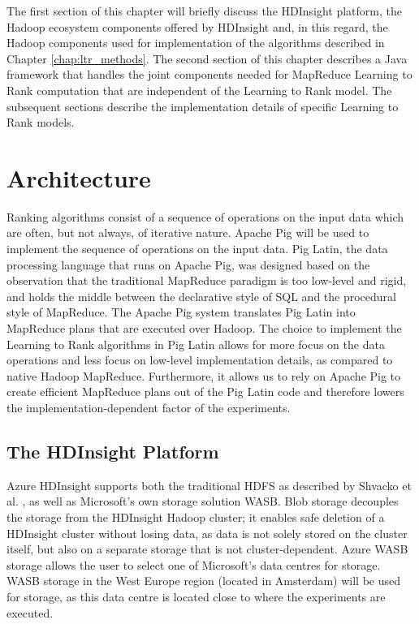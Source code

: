 \label{chap:implementation}
The first section of this chapter will briefly discuss the HDInsight platform, the Hadoop ecosystem components offered by HDInsight and, in this regard, the Hadoop components used for implementation of the algorithms described in Chapter \ref{chap:ltr_methods}. The second section of this chapter describes a Java framework that handles the joint components needed for MapReduce Learning to Rank computation that are independent of the Learning to Rank model. The subsequent sections describe the implementation details of specific Learning to Rank models.

\section{Architecture}
Ranking algorithms consist of a sequence of operations on the input data which are often, but not always, of iterative nature. Apache Pig \cite{Olston2008} will be used to implement the sequence of operations on the input data. Pig Latin, the data processing language that runs on Apache Pig, was designed based on the observation that the traditional MapReduce paradigm is too low-level and rigid, and holds the middle between the declarative style of SQL and the procedural style of MapReduce. The Apache Pig system translates Pig Latin into MapReduce plans that are executed over Hadoop. The choice to implement the Learning to Rank algorithms in Pig Latin allows for more focus on the data operations and less focus on low-level implementation details, as compared to native Hadoop MapReduce. Furthermore, it allows us to rely on Apache Pig to create efficient MapReduce plans out of the Pig Latin code and therefore lowers the implementation-dependent factor of the experiments.\\

\subsection{The HDInsight Platform}
Azure HDInsight supports both the traditional \ac{HDFS} as described by Shvacko et al. \cite{Shvachko2010}, as well as Microsoft's own storage solution \ac{WASB}. Blob storage decouples the storage from the HDInsight Hadoop cluster; it enables safe deletion of a HDInsight cluster without losing data, as data is not solely stored on the cluster itself, but also on a separate storage that is not cluster-dependent. Azure \ac{WASB} storage allows the user to select one of Microsoft's data centres for storage. \ac{WASB} storage in the West Europe region (located in Amsterdam) will be used for storage, as this data centre is located close to where the experiments are executed.\\

